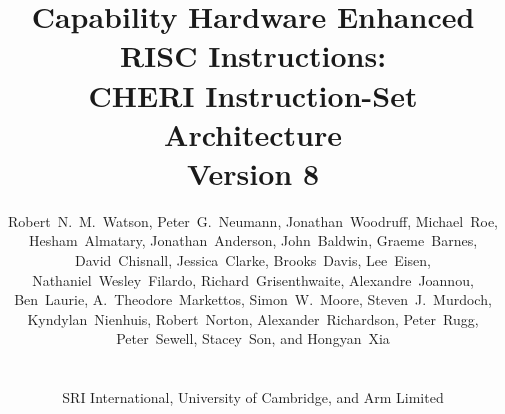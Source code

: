 \documentclass[12pt,twoside,openright,a4paper]{report}
\begin{document}
\title{Capability Hardware Enhanced RISC Instructions: \\
  \smallskip CHERI Instruction-Set Architecture \\
  {\large Version 8}}
\author{
  \parbox{\linewidth}{\centering%
    Robert~N.~M.~Watson,
    Peter~G.~Neumann,
    Jonathan~Woodruff,
    Michael~Roe,
    Hesham~Almatary,
    Jonathan~Anderson,
    John~Baldwin,
    Graeme~Barnes,
    David~Chisnall,
    Jessica~Clarke,
    Brooks~Davis,
    Lee~Eisen,
    Nathaniel~Wesley~Filardo,
    Richard~Grisenthwaite,
    Alexandre~Joannou,
    Ben~Laurie,
    A.~Theodore~Markettos,
    Simon~W.~Moore,
    Steven~J.~Murdoch,
    Kyndylan~Nienhuis,
    Robert~Norton,
    Alexander~Richardson,
    Peter~Rugg,
    Peter~Sewell,
    Stacey~Son, and
    Hongyan~Xia
  }%
  \\
  \\
  SRI International, University of Cambridge, and Arm Limited
}

%
%
%
%
\end{document}
